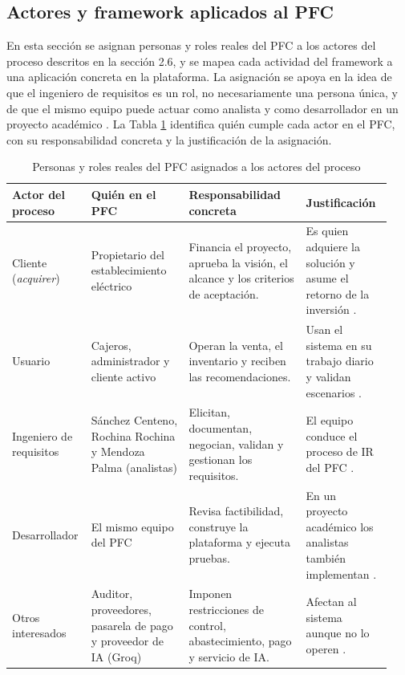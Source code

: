 \documentclass[onecolumn,12pt,a4paper]{IEEEtran}
\begin{document}
\subsection{Actores y framework aplicados al PFC}
En esta secci\'on se asignan personas y roles reales del PFC a los actores del proceso descritos en la secci\'on 2.6, y se mapea cada actividad del framework a una aplicaci\'on concreta en la plataforma. La asignaci\'on se apoya en la idea de que el ingeniero de requisitos es un rol, no necesariamente una persona \'unica, y de que el mismo equipo puede actuar como analista y como desarrollador en un proyecto acad\'emico \cite{pohl2025,ireb2023}. La Tabla \ref{tab:actores-pfc} identifica qui\'en cumple cada actor en el PFC, con su responsabilidad concreta y la justificaci\'on de la asignaci\'on.

\begin{table}[htbp]
\caption{Personas y roles reales del PFC asignados a los actores del proceso}
\label{tab:actores-pfc}
\centering
\footnotesize
\begin{tabular}{@{}p{0.17\linewidth}p{0.25\linewidth}p{0.30\linewidth}p{0.22\linewidth}@{}}
\toprule
\textbf{Actor del proceso} & \textbf{Qui\'en en el PFC} & \textbf{Responsabilidad concreta} & \textbf{Justificaci\'on}\\
\midrule
Cliente (\emph{acquirer}) & Propietario del establecimiento el\'ectrico & Financia el proyecto, aprueba la visi\'on, el alcance y los criterios de aceptaci\'on. & Es quien adquiere la soluci\'on y asume el retorno de la inversi\'on \cite{iso29148}.\\
Usuario & Cajeros, administrador y cliente activo & Operan la venta, el inventario y reciben las recomendaciones. & Usan el sistema en su trabajo diario y validan escenarios \cite{iso29148,pohl2025}.\\
Ingeniero de requisitos & S\'anchez Centeno, Rochina Rochina y Mendoza Palma (analistas) & Elicitan, documentan, negocian, validan y gestionan los requisitos. & El equipo conduce el proceso de IR del PFC \cite{pohl2025,ireb2023}.\\
Desarrollador & El mismo equipo del PFC & Revisa factibilidad, construye la plataforma y ejecuta pruebas. & En un proyecto acad\'emico los analistas tambi\'en implementan \cite{iso12207}.\\
Otros interesados & Auditor, proveedores, pasarela de pago y proveedor de IA (Groq) & Imponen restricciones de control, abastecimiento, pago y servicio de IA. & Afectan al sistema aunque no lo operen \cite{iso29148,pmbok7}.\\
\bottomrule
\end{tabular}
\end{table}
\end{document}
